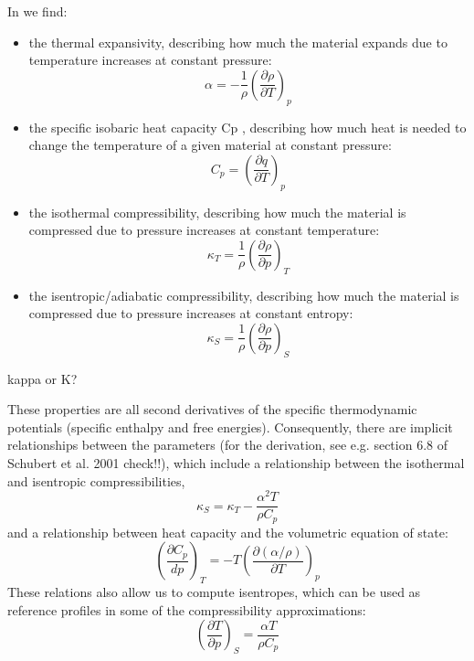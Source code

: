 \documentclass[a4paper,11pt]{article}
\begin{document}
In \cite{gadb20} we find:
\begin{itemize}
\item the thermal expansivity, describing how much the material
expands due to temperature increases at constant pressure:
\begin{equation}
\alpha = -\frac{1}{\rho} \left(  \frac{\partial \rho}{\partial T} \right)_p
\end{equation}

\item the specific isobaric heat capacity Cp , describing how much
heat is needed to change the temperature of a given material at
constant pressure:
\begin{equation}
C_p= \left(  \frac{\partial q}{\partial T} \right)_p
\end{equation}


\item the isothermal compressibility, describing how much the
material is compressed due to pressure increases at constant temperature:
\begin{equation}
\kappa_T = \frac{1}{\rho}  \left(  \frac{\partial \rho}{\partial p} \right)_T
\end{equation}



\item the isentropic/adiabatic compressibility, describing how
much the material is compressed due to pressure increases at constant entropy:
\begin{equation}
\kappa_S = \frac{1}{\rho}  \left(  \frac{\partial \rho}{\partial p} \right)_S
\end{equation}

\end{itemize}

{\color{red} kappa or K?}

These properties are all second derivatives of the specific thermodynamic potentials 
(specific enthalpy and free energies). Consequently, there are implicit relationships between the parameters (for the derivation, see e.g. section 6.8 of Schubert et al. 2001 {\color{red}check!!}),
which include a relationship between the isothermal and isentropic
compressibilities,
\[
\kappa_S = \kappa_T - \frac{\alpha^2T}{\rho C_p}
\]
and a relationship between heat capacity and the volumetric equation of state:
\[
\left(\frac{\partial C_p}{dp}\right)_T = -T
\left(  \frac{\partial (\alpha/\rho)}{\partial T}\right)_p
\]
These relations also allow us to compute isentropes, which can be
used as reference profiles in some of the compressibility approximations:
\[
\left(
\frac{\partial T}{\partial p} 
\right)_S 
=\frac{\alpha T}{\rho C_p}
\]
\end{document}
